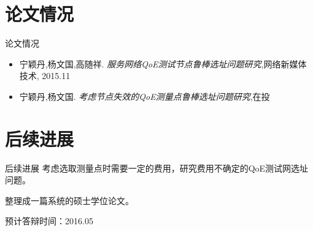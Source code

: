 \documentclass[10pt]{beamer}
\begin{document}
\section{论文情况}
\begin{frame}{论文情况}

 \begin{itemize}
   \item 宁颖丹,杨文国,高随祥. {\em 服务网络QoE测试节点鲁棒选址问题研究},网络新媒体技术, 2015.11
   \item 宁颖丹,杨文国. {\em 考虑节点失效的QoE测量点鲁棒选址问题研究},在投
 \end{itemize}
  

\end{frame}
\section{后续进展}
\begin{frame}{后续进展}
  考虑选取测量点时需要一定的费用，研究费用不确定的QoE测试网选址问题。

   整理成一篇系统的硕士学位论文。

预计答辩时间：2016.05
\end{frame}





\end{document}
